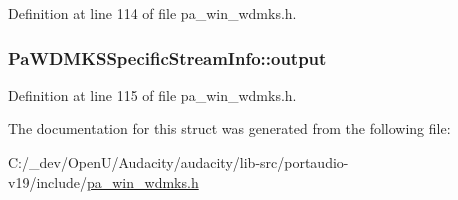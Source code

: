 Definition at line 114 of file pa\+\_\+win\+\_\+wdmks.\+h.

\subsubsection[{\texorpdfstring{output}{output}}]{ Pa\+W\+D\+M\+K\+S\+Specific\+Stream\+Info\+::output}\hypertarget{struct_pa_w_d_m_k_s_specific_stream_info_a99f218f86f2ee9c1f56ae657e1de62cb}{}\label{struct_pa_w_d_m_k_s_specific_stream_info_a99f218f86f2ee9c1f56ae657e1de62cb}


Definition at line 115 of file pa\+\_\+win\+\_\+wdmks.\+h.



The documentation for this struct was generated from the following file\+:\begin{DoxyCompactItemize}
\item 
C\+:/\+\_\+dev/\+Open\+U/\+Audacity/audacity/lib-\/src/portaudio-\/v19/include/\hyperlink{pa__win__wdmks_8h}{pa\+\_\+win\+\_\+wdmks.\+h}\end{DoxyCompactItemize}
